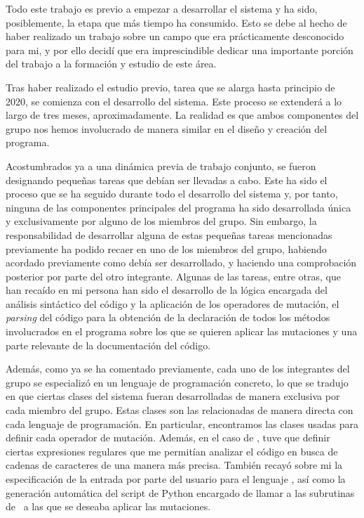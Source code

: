 Todo este trabajo es previo a empezar a desarrollar el sistema  y ha sido, posiblemente, la etapa que más tiempo ha consumido. Esto se debe al hecho de haber realizado un trabajo sobre un campo que era prácticamente desconocido para mi, y por ello decidí que era imprescindible dedicar una importante porción del trabajo a la formación y  estudio de este área.

Tras haber realizado el estudio previo, tarea que se alarga hasta principio de 2020, se comienza con el desarrollo del sistema. Este proceso se extenderá a lo largo de tres meses, aproximadamente. La realidad es que ambos componentes del grupo nos hemos involucrado de manera similar en el diseño y creación del programa.

Acostumbrados ya a una dinámica previa de trabajo conjunto, se fueron designando pequeñas tareas que debían ser llevadas a cabo. Este ha sido el proceso que se ha seguido durante todo el desarrollo del sistema y, por tanto, ninguna de las componentes principales del programa ha sido desarrollada única y exclusivamente por alguno de los miembros del grupo. Sin embargo, la responsabilidad de desarrollar alguna de estas pequeñas tareas mencionadas previamente ha podido recaer en uno de los miembros del grupo, habiendo acordado previamente como debía ser desarrollado, y haciendo una comprobación posterior por parte del otro integrante. Algunas de las tareas, entre otras, que han recaído en mi persona han sido el desarrollo de la lógica encargada del análisis sintáctico del código y la aplicación de los operadores de mutación, el {\it parsing} del código para la obtención de la declaración de todos los métodos involucrados en el programa sobre los que se quieren aplicar las mutaciones y una parte relevante de la documentación del código.

Además, como ya se ha comentado previamente, cada uno de los integrantes del grupo se especializó en un lenguaje de programación concreto, lo que se tradujo en que ciertas clases del sistema fueran desarrolladas de manera exclusiva por cada miembro del grupo. Estas clases son las relacionadas de manera directa con cada lenguaje de programación. En particular, encontramos las clases usadas para definir cada operador de mutación. Además, en el caso de \qsh, tuve que definir ciertas expresiones regulares que me permitían analizar el código en busca de cadenas de caracteres de una manera más precisa. También recayó sobre mi la especificación de la entrada por parte del usuario para el lenguaje \qsh, así como la generación automática del script de Python encargado de llamar a las subrutinas de \qsh\ a las que se deseaba aplicar las mutaciones.

